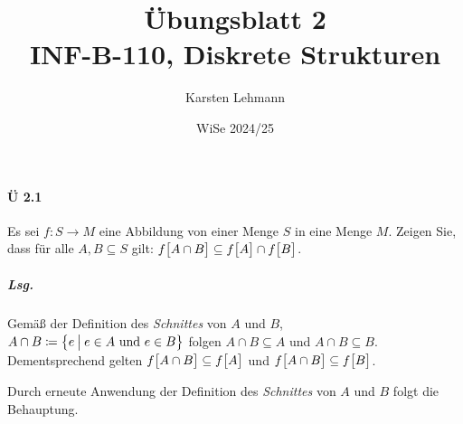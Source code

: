 \documentclass{scrreprt}
\author{Karsten Lehmann}
\date{WiSe 2024/25}
\title{Übungsblatt 2\\INF-B-110, Diskrete Strukturen}
\begin{document}
\paragraph{Ü 2.1} Es sei $f \colon S \to M$ eine Abbildung von einer Menge $S$ in
eine Menge $M$.
Zeigen Sie, dass für alle $A, B \subseteq S$ gilt:
$f\qty\big[A \cap B] \subseteq f\qty\big[A] \cap f\qty\big[B]$.

\subparagraph{Lsg.} Gemäß der Definition des \emph{Schnittes} von $A$ und $B$,
$A \cap B \coloneqq \qty\big{e \:{\big |}\: e \in A \text{ und } e \in B}$
folgen $A \cap B \subseteq A$ und $A \cap B \subseteq B$.
Dementsprechend gelten $f\qty\big[A \cap B] \subseteq f\qty\big[A]$ und
$f\qty\big[A \cap B] \subseteq f\qty\big[B]$.

Durch erneute Anwendung der Definition des \emph{Schnittes} von $A$ und $B$ folgt
die Behauptung.
\end{document}
